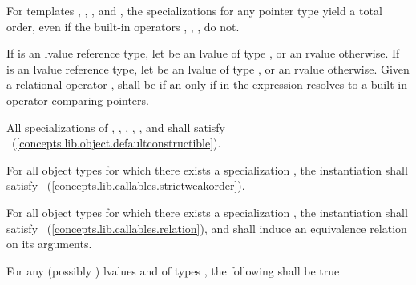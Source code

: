 \pnum
For templates , , , and
, the specializations for any pointer type yield a total order,
even if the built-in operators \tcode{<}, \tcode{>}, \tcode{<=}, \tcode{>=}
do not. 

\begin{addedblock}
\pnum
If  is an lvalue reference type, let  be an lvalue of type , or an rvalue otherwise.
If  is an lvalue reference type, let  be an lvalue of type , or an rvalue otherwise.
Given a relational operator , 
shall be  if an only if  in the expression 
resolves to a built-in operator comparing pointers.

\pnum
All specializations of , , , ,
, and  shall satisfy ~(\ref{concepts.lib.object.defaultconstructible}).

\pnum
For all object types  for which there exists a specialization ,
the instantiation  shall satisfy ~(\ref{concepts.lib.callables.strictweakorder}).

\pnum
For all object types  for which there exists a specialization ,
the instantiation  shall satisfy ~(\ref{concepts.lib.callables.relation}),
and  shall induce an equivalence relation on its arguments.

\pnum
For any (possibly ) lvalues  and  of types , the following
shall be true


\end{addedblock}
